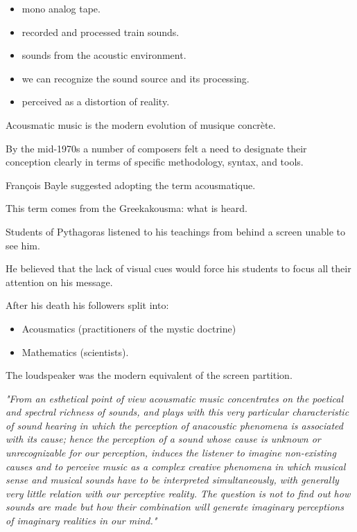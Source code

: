 \begin{itemize}
\tightlist
\item mono analog tape.
\item recorded and processed train sounds.
\item sounds from the acoustic environment.
\item we can recognize the sound source and its processing.
\item perceived as a distortion of reality.
\end{itemize}

Acousmatic music is the modern evolution of musique concrète.

By the mid-1970s a number of composers felt a need to designate their conception clearly in terms of specific methodology, syntax, and tools.

François Bayle suggested adopting the term acousmatique.

This term comes from the Greekakousma: what is heard.

Students of Pythagoras listened to his teachings from behind a screen unable to see him.

He believed that the lack of visual cues would force his students to focus all their attention on his message.

After his death his followers split into:

\begin{itemize}
\tightlist
\item Acousmatics (practitioners of the mystic doctrine)
\item Mathematics (scientists).
\end{itemize}

The loudspeaker was the modern equivalent of the screen partition.

\textit{"From an esthetical point of view acousmatic music concentrates on the poetical and spectral richness of sounds, and plays with this very particular characteristic of sound hearing in which the perception of anacoustic phenomena is associated with its cause; hence the perception of a sound whose cause is unknown or unrecognizable for our perception, induces the listener to imagine non-existing causes and to perceive
music as a complex creative phenomena in which musical sense and musical sounds have to be interpreted simultaneously, with generally very little relation with our perceptive reality. The question is not to find out how sounds are made but how their combination will generate imaginary perceptions of imaginary realities in our mind."}

